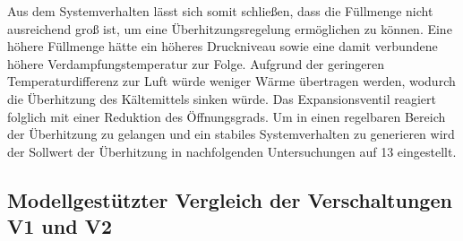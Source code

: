 Aus dem Systemverhalten lässt sich somit schließen, dass die Füllmenge nicht ausreichend groß ist, um eine Überhitzungsregelung ermöglichen zu können. Eine höhere Füllmenge hätte ein höheres Druckniveau sowie eine damit verbundene höhere Verdampfungstemperatur zur Folge. Aufgrund der geringeren Temperaturdifferenz zur Luft würde weniger Wärme übertragen werden, wodurch die Überhitzung des Kältemittels sinken würde. Das Expansionsventil reagiert folglich mit einer Reduktion des Öffnungsgrads. Um in einen regelbaren Bereich der Überhitzung zu gelangen und ein stabiles Systemverhalten zu generieren wird der Sollwert der Überhitzung in nachfolgenden Untersuchungen auf \unit{13}{\kelvin} eingestellt. 



\subsection{Modellgestützter Vergleich der Verschaltungen V1 und V2}
\label{subsec:Modellgestützter Vergleich der Verschaltungen V1 und V2_1}

